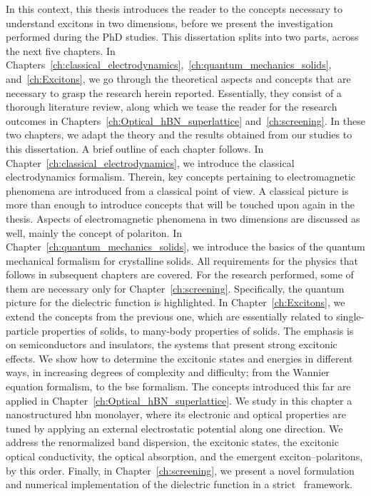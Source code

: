 In this context, this thesis introduces the reader to the concepts necessary to understand excitons in two dimensions, before we present the investigation performed during the PhD studies.
This dissertation splits into two parts, across the next five chapters.
In Chapters~\ref{ch:classical_electrodynamics},~\ref{ch:quantum_mechanics_solids}, and~\ref{ch:Excitons}, we go through the theoretical aspects and concepts that are necessary to grasp the research herein reported.
Essentially, they consist of a thorough literature review, along which we tease the reader for the research outcomes in Chapters~\ref{ch:Optical_hBN_superlattice} and~\ref{ch:screening}.
In these two chapters, we adapt the theory and the results obtained from our studies to this dissertation.
A brief outline of each chapter follows.
In Chapter~\ref{ch:classical_electrodynamics}, we introduce the classical electrodynamics formalism.
Therein, key concepts pertaining to electromagnetic phenomena are introduced from a classical point of view.
A classical picture is more than enough to introduce concepts that will be touched upon again in the thesis.
Aspects of electromagnetic phenomena in two dimensions are discussed as well, mainly the concept of polariton.
In Chapter~\ref{ch:quantum_mechanics_solids}, we introduce the basics of the quantum mechanical formalism for crystalline solids.
All requirements for the physics that follows in subsequent chapters are covered.
For the research performed, some of them are necessary only for Chapter~\ref{ch:screening}.
Specifically, the quantum picture for the dielectric function is highlighted.
In Chapter~\ref{ch:Excitons}, we extend the concepts from the previous one, which are essentially related to single-particle properties of solids, to many-body properties of solids.
The emphasis is on semiconductors and insulators, the systems that present strong excitonic effects.
We show how to determine the excitonic states and energies in different ways, in increasing degrees of complexity and difficulty; from the Wannier equation formalism, to the \gls{bse} formalism.
The concepts introduced this far are applied in Chapter~\ref{ch:Optical_hBN_superlattice}.
We study in this chapter a nanostructured \gls{hbn} monolayer, where its electronic and optical properties are tuned by applying an external electrostatic potential along one direction.
We address the renormalized band dispersion, the excitonic states, the excitonic optical conductivity, the optical absorption, and the emergent exciton--polaritons, by this order.
Finally, in Chapter~\ref{ch:screening}, we present a novel formulation and numerical implementation of the dielectric function in a strict \bd~framework.
